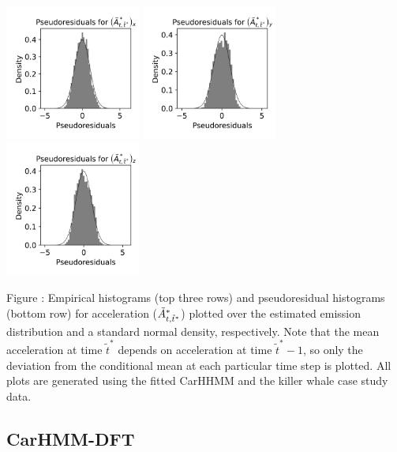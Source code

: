 \documentclass{article}
\begin{document}
\begin{center}
        \includegraphics[width=1.75in]{../Plots/2019/20190902-182840-CATs_OB_1_0_267_CarHHMM1_pseudresids_Ax.png}
        \includegraphics[width=1.75in]{../Plots/2019/20190902-182840-CATs_OB_1_0_267_CarHHMM1_pseudresids_Ay.png}
        \includegraphics[width=1.75in]{../Plots/2019/20190902-182840-CATs_OB_1_0_267_CarHHMM1_pseudresids_Az.png}
        \end{center}
        
        \noindent Figure : Empirical histograms (top three rows) and pseudoresidual histograms (bottom row) for acceleration ($\tilde{A}^*_{t,\tilde t^*}$) plotted over the estimated emission distribution and a standard normal density, respectively. Note that the mean acceleration at time $\tilde t^*$ depends on acceleration at time $\tilde t^*-1$, so only the deviation from the conditional mean at each particular time step is plotted. All plots are generated using the fitted CarHHMM and the killer whale case study data.
        \addtocounter{fignum}{1}
        
        \newpage
        
        \subsection{CarHMM-DFT}
        
\end{document}
